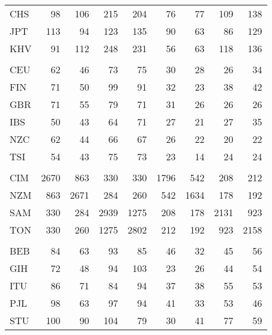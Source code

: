 \documentclass[]{report}
\begin{document}
\begin{table}
\begin{tabular}[t]{lrrrrrrrr}
\hspace{1em}CHS & 98 & 106 & 215 & 204 & 76 & 77 & 109 & 138\\
\hspace{1em}JPT & 113 & 94 & 123 & 135 & 90 & 63 & 86 & 129\\
\hspace{1em}KHV & 91 & 112 & 248 & 231 & 56 & 63 & 118 & 136\\
\addlinespace[0.3em]
\multicolumn{9}{l}{\textbf{EUR}}\\
\hspace{1em}CEU & 62 & 46 & 73 & 75 & 30 & 28 & 26 & 34\\
\hspace{1em}FIN & 71 & 50 & 99 & 91 & 32 & 23 & 38 & 42\\
\hspace{1em}GBR & 71 & 55 & 79 & 71 & 31 & 26 & 26 & 26\\
\hspace{1em}IBS & 50 & 43 & 64 & 71 & 27 & 21 & 27 & 35\\
\hspace{1em}NZC & 62 & 44 & 66 & 67 & 26 & 22 & 20 & 22\\
\hspace{1em}TSI & 54 & 43 & 75 & 73 & 23 & 14 & 24 & 24\\
\addlinespace[0.3em]
\multicolumn{9}{l}{\textbf{POL}}\\
\hspace{1em}CIM & 2670 & 863 & 330 & 330 & 1796 & 542 & 208 & 212\\
\hspace{1em}NZM & 863 & 2671 & 284 & 260 & 542 & 1634 & 178 & 192\\
\hspace{1em}SAM & 330 & 284 & 2939 & 1275 & 208 & 178 & 2131 & 923\\
\hspace{1em}TON & 330 & 260 & 1275 & 2802 & 212 & 192 & 923 & 2158\\
\addlinespace[0.3em]
\multicolumn{9}{l}{\textbf{SAS}}\\
\hspace{1em}BEB & 84 & 63 & 93 & 85 & 46 & 32 & 45 & 56\\
\hspace{1em}GIH & 72 & 48 & 94 & 103 & 23 & 26 & 44 & 54\\
\hspace{1em}ITU & 86 & 71 & 84 & 94 & 37 & 38 & 55 & 53\\
\hspace{1em}PJL & 98 & 63 & 97 & 94 & 41 & 33 & 53 & 46\\
\hspace{1em}STU & 100 & 90 & 104 & 79 & 30 & 41 & 77 & 59\\
\bottomrule
\end{tabular}
\end{table}
\end{document}
